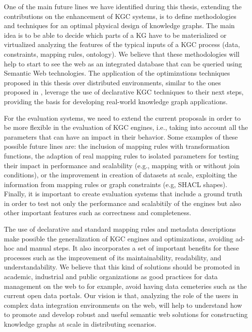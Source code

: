 One of the main future lines we have identified during this thesis, extending the contributions on the enhancement of KGC systems, is to define methodologies and techniques for an optimal physical design of knowledge graphs. The main idea is to be able to decide which parts of a KG have to be materialized or virtualized analyzing the features of the typical inputs of a KGC process (data, constraints, mapping rules, ontology). We believe that these methodologies will help to start to see the web as an integrated database that can be queried using Semantic Web technologies. The application of the optimizations techniques proposed in this thesis over distributed environments, similar to the ones proposed in \citep{endris2019ontario,mami2019squerall}, leverage the use of declarative KGC techniques to their next steps, providing the basis for developing real-world knowledge graph applications.

For the evaluation systems, we need to extend the current proposals in order to be more flexible in the evaluation of KGC engines, i.e., taking into account all the parameters that can have an impact in their behavior. Some examples of these possible future lines are: the inclusion of mapping rules with transformation functions, the adaption of real mapping rules to isolated parameters for testing their impact in performance and scalability (e.g., mapping with or without join conditions), or the improvement in creation of datasets at scale, exploiting the information from mapping rules or graph constraints (e.g, SHACL shapes). Finally, it is important to create evaluation systems that include a ground truth in order to test not only the performance and scalabitily of the engines but also other important features such as correctness and completeness.

The use of declarative and standard mapping rules and metadata descriptions make possible the generalization of KGC engines and optimizations, avoiding ad-hoc and manual steps. It also incorporates a set of important benefits for these processes such as the improvement of its maintainability, readability, and understandability. We believe that this kind of solutions should be promoted in academic, industrial and public organizations as good practices for data management on the web to for example, avoid having data cemeteries such as the current open data portals. Our vision is that, analyzing the role of the users in complex data integration environments on the web, will help to understand how to promote and develop robust and useful semantic web solutions for constructing knowledge graphs at scale in distributing scenarios.

